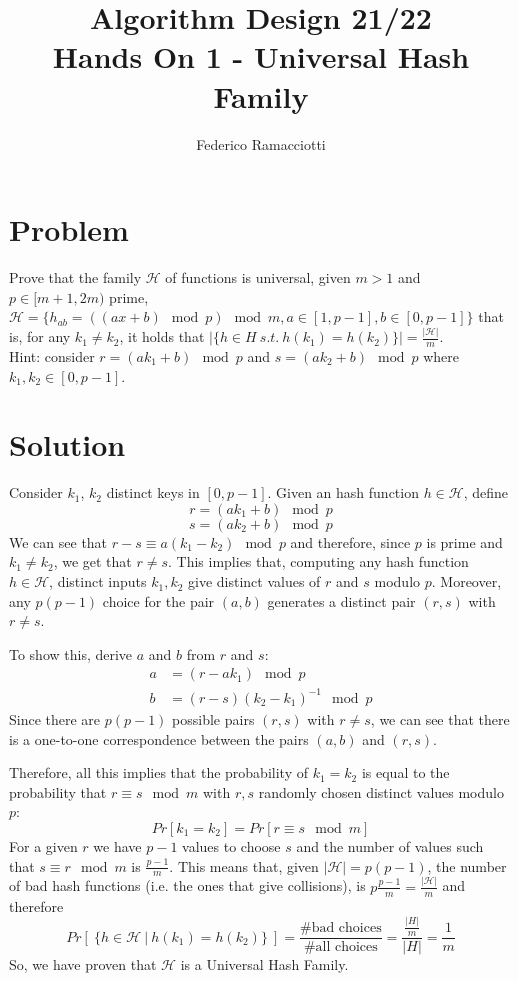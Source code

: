 \documentclass{article}
\title{\LARGE{\textbf{Algorithm Design 21/22}}\\ \vspace{1cm} Hands On 1 - Universal Hash Family}
\author{Federico Ramacciotti}
\date{}
\begin{document}
\maketitle

\section{Problem}
Prove that the family $\mathcal{H}$ of functions is universal, given $m>1$ and $p\in[m+1,2m)$ prime, $\mathcal{H}=\{h_{ab}=((ax+b)\mod p)\mod m, a\in[1,p-1], b\in[0,p-1]\}$ that is, for any $k_1\neq k_2$, it holds that $|\{ h\in H\ s.t.\ h(k_1)=h(k_2)\}|=\frac{|\mathcal{H}|}{m}$.\\
Hint: consider $r = (a k_1 + b)\mod p$ and $s = (a k_2 + b)\mod p$ where $k_1, k_2 \in[0,p-1]$.

\section{Solution}
Consider $k_1$, $k_2$ distinct keys in $[0,p-1]$. Given an hash function $h\in \mathcal{H}$, define $$r=(ak_1+b)\mod p$$ $$s=(ak_2+b)\mod p$$
We can see that $r-s \equiv a(k_1-k_2)\mod p$ and therefore, since $p$ is prime and $k_1\neq k_2$, we get that $r\neq s$. This implies that, computing any hash function $h\in \mathcal{H}$, distinct inputs $k_1,k_2$ give distinct values of $r$ and $s$ modulo $p$. Moreover, any $p(p-1)$ choice for the pair $(a,b)$ generates a distinct pair $(r,s)$ with $r\neq s$.

To show this, derive $a$ and $b$ from $r$ and $s$:
\begin{align*}
   a&=(r-ak_1)\mod p\\ 
   b&=(r-s)(k_2-k_1)^{-1}\mod p
\end{align*}
Since there are $p(p-1)$ possible pairs $(r,s)$ with $r\neq s$, we can see that there is a one-to-one correspondence between the pairs $(a,b)$ and $(r,s)$.

Therefore, all this implies that the probability of $k_1=k_2$ is equal to the probability that $r\equiv s\mod m$ with $r,s$ randomly chosen distinct values modulo $p$:
$$ Pr[k_1=k_2] = Pr[r\equiv s\mod m]$$
For a given $r$ we have $p-1$ values to choose $s$ and the number of values such that $s\equiv r\mod m$ is $\frac{p-1}{m}$. 
This means that, given $|\mathcal{H}|=p(p-1)$, the number of bad hash functions (i.e. the ones that give collisions), is $p\frac{p-1}{m}=\frac{|\mathcal{H}|}{m}$ and therefore $$ Pr\left[\ \{h\in \mathcal{H}\ |\ h(k_1)=h(k_2)\}\ \right] = \frac{\textrm{\# bad choices}}{\textrm{\# all choices}} = \frac{\frac{|H|}{m}}{|H|} = \frac{1}{m} $$
So, we have proven that $\mathcal{H}$ is a Universal Hash Family.
\end{document}
